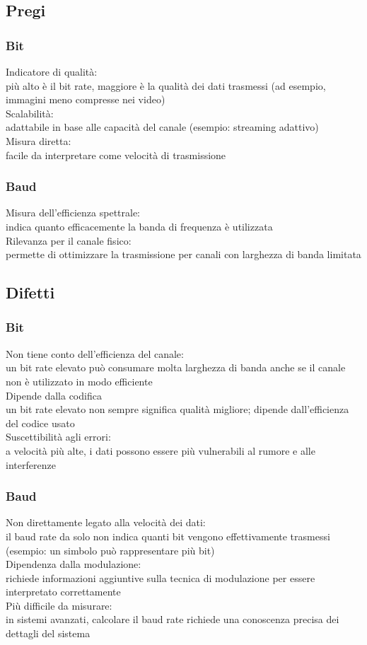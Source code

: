 \documentclass[10pt,oneside,a4paper]{article}
\begin{document}
\subsection{Pregi}
\subsubsection{Bit}
Indicatore di qualità:\\
più alto è il bit rate, maggiore è la qualità dei dati trasmessi (ad esempio, immagini meno compresse nei video)\\
Scalabilità:\\
adattabile in base alle capacità del canale (esempio: streaming adattivo)\\
Misura diretta:\\
facile da interpretare come velocità di trasmissione
\subsubsection{Baud}
Misura dell'efficienza spettrale:\\
indica quanto efficacemente la banda di frequenza è utilizzata\\
Rilevanza per il canale fisico:\\
permette di ottimizzare la trasmissione per canali con larghezza di banda limitata
\subsection{Difetti}
\subsubsection{Bit}
Non tiene conto dell'efficienza del canale:\\
un bit rate elevato può consumare molta larghezza di banda anche se il canale non è utilizzato in modo efficiente\\
Dipende dalla codifica\\
un bit rate elevato non sempre significa qualità migliore; dipende dall'efficienza del codice usato\\
Suscettibilità agli errori:\\
a velocità più alte, i dati possono essere più vulnerabili al rumore e alle interferenze\\
\subsubsection{Baud}
Non direttamente legato alla velocità dei dati:\\
il baud rate da solo non indica quanti bit vengono effettivamente trasmessi (esempio: un simbolo può rappresentare più bit)\\
Dipendenza dalla modulazione:\\
richiede informazioni aggiuntive sulla tecnica di modulazione per essere interpretato correttamente\\
Più difficile da misurare:\\
in sistemi avanzati, calcolare il baud rate richiede una conoscenza precisa dei dettagli del sistema
\end{document}
